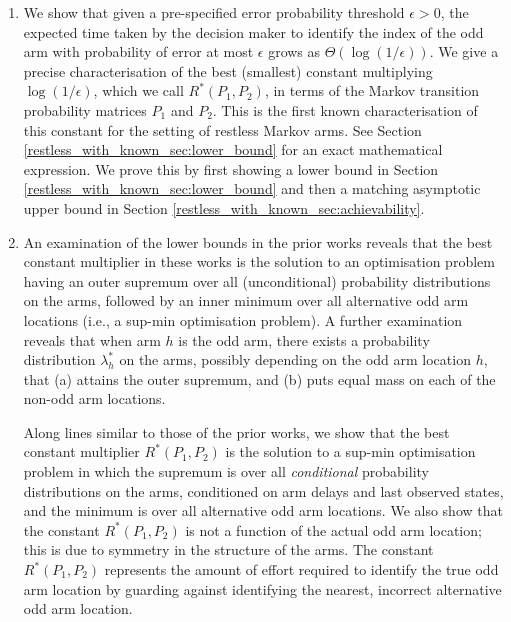 \begin{enumerate}
	\item We show that given a pre-specified error probability threshold $\epsilon>0$, the expected time taken by the decision maker to identify the index of the odd arm with probability of error at most $\epsilon$ grows as $\Theta(\log (1/\epsilon))$. We give a precise characterisation of the best (smallest) constant multiplying $\log (1/\epsilon)$, which we call $R^*(P_1,P_2)$, in terms of the Markov transition probability matrices $P_1$ and $P_2$. This is the first known characterisation of this constant for the setting of restless Markov arms. 
       See Section \ref{restless_with_known_sec:lower_bound} for an exact mathematical expression. 
       We prove this by first showing a lower bound in Section \ref{restless_with_known_sec:lower_bound} and then a matching asymptotic upper bound in Section \ref{restless_with_known_sec:achievability}.
      
     \item An examination of the lower bounds in the prior works \cite{Vaidhiyan2017,vaidhiyan2012active, vaidhiyan2017learning, prabhu2017optimal} reveals that the best constant multiplier in these works is the solution to an optimisation problem having an outer supremum over all (unconditional) probability distributions on the arms, followed by an inner minimum over all alternative odd arm locations (i.e., a sup-min optimisation problem). A further examination reveals that when arm $h$ is the odd arm, there exists a probability distribution $\lambda_h^*$ on the arms, possibly depending on the odd arm location $h$,  that (a) attains the outer supremum, and (b) puts equal mass on each of the non-odd arm locations.
     
      Along lines similar to those of the prior works, we show that the best constant multiplier $R^*(P_1,P_2)$ is the solution to a sup-min optimisation problem in which the supremum is over all \emph{conditional} probability distributions on the arms, conditioned on arm delays and last observed states, and the minimum is over all alternative odd arm locations. We also show that the constant $R^*(P_1,P_2)$ is not a function of the actual odd arm location; this is due to symmetry in the structure of the arms. The constant $R^*(P_1,P_2)$ represents the amount of effort required to identify the true odd arm location by guarding against identifying the nearest, incorrect alternative odd arm location. 
     

\end{enumerate}

